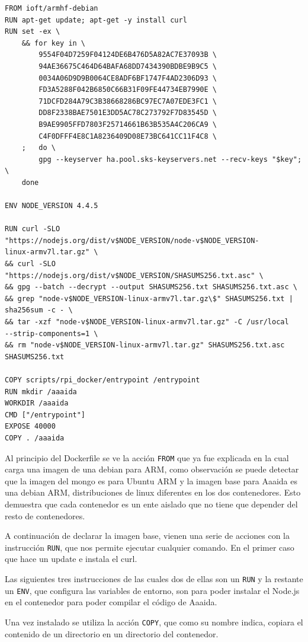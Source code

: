 \begin{verbatim}
FROM ioft/armhf-debian
RUN apt-get update; apt-get -y install curl
RUN set -ex \  
	&& for key in \    
		9554F04D7259F04124DE6B476D5A82AC7E37093B \ 
        94AE36675C464D64BAFA68DD7434390BDBE9B9C5 \
        0034A06D9D9B0064CE8ADF6BF1747F4AD2306D93 \ 
        FD3A5288F042B6850C66B31F09FE44734EB7990E \    
        71DCFD284A79C3B38668286BC97EC7A07EDE3FC1 \    
        DD8F2338BAE7501E3DD5AC78C273792F7D83545D \    
        B9AE9905FFD7803F25714661B63B535A4C206CA9 \    
        C4F0DFFF4E8C1A8236409D08E73BC641CC11F4C8 \  
	; 	do \  
		gpg --keyserver ha.pool.sks-keyservers.net --recv-keys "$key"; \  
	done

ENV NODE_VERSION 4.4.5

RUN curl -SLO 
"https://nodejs.org/dist/v$NODE_VERSION/node-v$NODE_VERSION-
linux-armv7l.tar.gz" \  
&& curl -SLO "https://nodejs.org/dist/v$NODE_VERSION/SHASUMS256.txt.asc" \  
&& gpg --batch --decrypt --output SHASUMS256.txt SHASUMS256.txt.asc \  
&& grep "node-v$NODE_VERSION-linux-armv7l.tar.gz\$" SHASUMS256.txt | 
sha256sum -c - \  
&& tar -xzf "node-v$NODE_VERSION-linux-armv7l.tar.gz" -C /usr/local 
--strip-components=1 \  
&& rm "node-v$NODE_VERSION-linux-armv7l.tar.gz" SHASUMS256.txt.asc 
SHASUMS256.txt

COPY scripts/rpi_docker/entrypoint /entrypoint
RUN mkdir /aaaida
WORKDIR /aaaida
CMD ["/entrypoint"]
EXPOSE 40000
COPY . /aaaida
\end{verbatim}

Al principio del Dockerfile se ve la acción \texttt{FROM} que ya fue explicada en la cual carga una imagen de una debian para ARM, como observación se puede detectar que la imagen del mongo es para Ubuntu ARM y la imagen base para Aaaida es una debian ARM, distribuciones de linux diferentes en los dos contenedores. Esto demuestra que cada contenedor es un ente aislado que no tiene que depender del resto de contenedores.
 
A continuación de declarar la imagen base, vienen una serie de acciones con la instrucción \texttt{RUN}, que nos permite ejecutar cualquier comando. En el primer caso que hace un update e instala el curl.
 
Las siguientes tres instrucciones de las cuales dos de ellas son un \texttt{RUN} y la restante un \texttt{ENV}, que configura las variables de entorno, son para poder instalar el Node.js en el contenedor para poder compilar el código de Aaaida.
 
Una vez instalado se utiliza la acción \texttt{COPY}, que como su nombre indica, copiara el contenido de un directorio en un directorio del contenedor.

